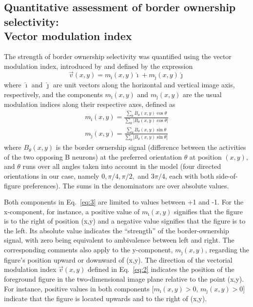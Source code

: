 {\subsection{Quantitative assessment of border ownership selectivity:\\
  Vector modulation index}
\label{sec:vmi}
The strength of border ownership selectivity was quantified using the
vector modulation index, introduced by \cite{Craft_etal07} and defined
by the expression 
\begin{equation}
\label{eq:2}
\vec{v}(x,y) = m_{\hat{\imath}}(x,y)\hat{\imath} + m_{\hat{\jmath}}(x,y)\hat{\jmath}
\end{equation}
where $\hat{\imath}$ and $\hat{\jmath}$ are unit vectors along the horizontal and vertical image
axis, respectively, and the components $m_{\hat{\imath}}(x,y)$ and $m_{\hat{\jmath}}(x,y)$ are the usual modulation indices along their respective axes, defined as
\begin{equation}
\label{eq:3}
\begin{split}
	m_{\hat{\imath}}(x,y) = \frac{\sum_{\theta}
        B_{\theta}(x,y)\cos\theta}{\sum_{\theta}
                \left|B_{\theta}(x,y)\cos\theta\right|} \\
	m_{\hat{\jmath}}(x,y) = \frac{\sum_{\theta}
        B_{\theta}(x,y)\sin\theta}{\sum_{\theta}
                \left|B_{\theta}(x,y)\sin\theta\right|}
\end{split}
\end{equation}
where $B_{\theta}(x,y)$ is the border ownership signal (difference between
the activities of the two opposing B neurons) at the preferred
orientation $\theta$ at position $(x,y)$, and $\theta$ runs over all
angles taken into account in the model 
(four directed orientations in our case, namely $0, \pi/4, \pi/2,$
and $3\pi/4$, each with both side-of-figure preferences). The sums in the denominators are over absolute values.

Both components in Eq.~\ref{eq:3} are limited to values between +1 and
-1. For the x-component, for instance, a positive value of
$m_{\hat{\imath}}(x,y)$ signifies that the figure is to the right of
position (x,y) and a negative value signifies that the figure is to
the left. Its absolute value indicates the ``strength'' of the
border-ownership signal, with zero being equivalent to ambivalence
between left and right. The corresponding comments also apply to the
y-component, $m_{\hat{\jmath}}(x,y)$, regarding the figure's position
upward or downward of (x,y). The direction of the vectorial modulation
index $\vec{v}(x,y)$ defined in Eq.~\ref{eq:2} indicates the position
of the foreground figure in the two-dimensional image plane relative to
the point (x,y). For instance, positive values in both components
[$m_{\hat{\imath}}(x,y) > 0$, $m_{\hat{\jmath}}(x,y) > 0$] indicate
that the figure is located upwards and to the right of (x,y).  

}
